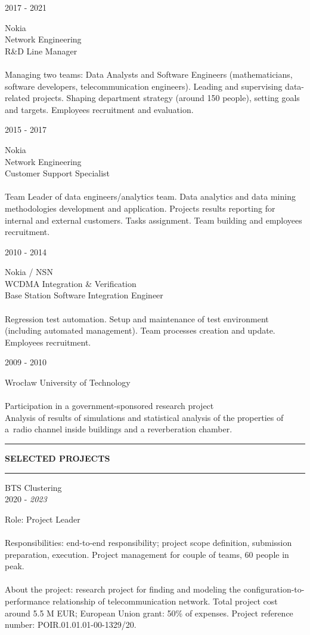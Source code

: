 \documentclass[a4paper]{article}
\makeatletter
\newcommand*{\thickhrulefill}{%
\color{nokiaBlue}
\leavevmode %
\leaders\hrule depth -2pt height 3pt \hfill
\kern 0pt\relax %
\color{black}
}
\newcommand*{\thickhrule}{%
\color{nokiaBlue}
\rule[2pt]{0.7cm}{1pt}
\color{black}
}
\def\cvsekcja#1{%
\vspace{0.1cm}
\noindent\thickhrule
\MakeUppercase{\textbf{\footnotesize#1}}
\hspace{0.1cm}\color{nokiaBlue}\thickhrulefill
}
\def\cvwpis#1#2{%
\noindent
\newline
\begin{minipage}[t]{0.2\textwidth}
  \begin{flushleft}
  #1 
\end{flushleft}
\end{minipage}
\begin{minipage}[t]{0.8\textwidth}
  #2
\end{minipage}
}
\makeatother
\begin{document}
\cvwpis{2017 - 2021}
{Nokia\\
Network Engineering\\
R\&D Line Manager\\
\vspace{-7pt}
\\Managing two teams: Data Analysts and Software Engineers (mathematicians, software developers, telecommunication engineers).
Leading and supervising data-related projects.
Shaping department strategy (around 150 people), setting goals and targets.
Employees recruitment and evaluation. 
}

\cvwpis{2015 - 2017}
{Nokia\\
Network Engineering\\
Customer Support Specialist\\
\vspace{-7pt}
\\Team Leader of data engineers/analytics team. Data analytics and data mining methodologies development and
application. Projects results reporting for internal and external
customers. Tasks assignment. Team building and employees recruitment.
}

\cvwpis{2010 - 2014}
{Nokia / NSN\\
WCDMA Integration \& Verification\\
Base Station Software Integration Engineer\\
\vspace{-7pt}
\\Regression test automation.
Setup and maintenance of test environment (including automated management).
Team processes creation and update.
Employees recruitment.
}

\cvwpis{2009 - 2010}
{Wrocław University of Technology\\
\vspace{-7pt}
\\Participation in a government-sponsored research project\\
Analysis of results of simulations and statistical analysis of the
properties of a~radio channel inside buildings and a reverberation chamber.
}
\pagebreak


\cvsekcja{Selected Projects}

\cvwpis{BTS Clustering  \vspace{5pt} \\2020 - \textit{2023}}
{
    Role: Project Leader\\
    \vspace{-8pt}
    \\Responsibilities: end-to-end responsibility; project scope definition,
        submission preparation, execution. Project management for couple of teams,
        60 people in peak.\\
    \vspace{-8pt}
    \\About the project: research project for finding and modeling the configuration-to-performance
    relationship of telecommunication network. 
        Total project cost around 5.5 M EUR; European Union grant: 50\% of
        expenses.
        Project reference number: POIR.01.01.01-00-1329/20.
}
\end{document}
